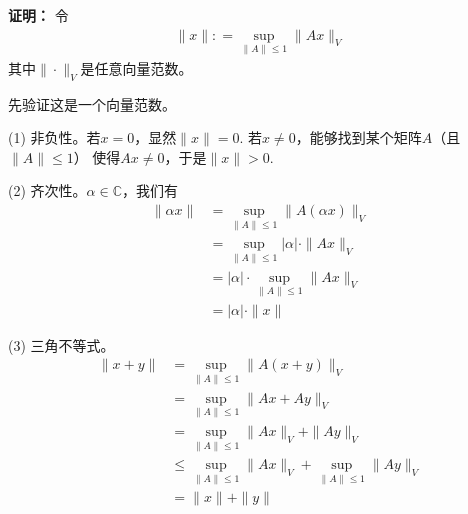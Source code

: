 \documentclass{article}
\begin{document}
\textbf{证明：}
令
\begin{align*}
  \|x\| : = \sup \limits_{\|A\| \leq 1} \|Ax\|_V
\end{align*}
其中$\|\cdot\|_V$是任意向量范数。

先验证这是一个向量范数。

(1) 非负性。若$x = 0$，显然$\|x\| = 0$. 若$x \neq 0$，能够找到某个矩阵$A$（且$\|A\| \leq 1$）
使得$Ax \neq 0$，于是$\|x\| > 0$.

(2) 齐次性。$\alpha \in \mathbb{C}$，我们有
\begin{align*}
  \|\alpha x\|
   & = \sup \limits_{\|A\| \leq 1} \|A(\alpha x)\|_V       \\
   & = \sup \limits_{\|A\| \leq 1} |\alpha| \cdot \|Ax\|_V \\
   & = |\alpha| \cdot \sup \limits_{\|A\| \leq 1} \|Ax\|_V \\
   & = |\alpha| \cdot \|x\|
\end{align*}

(3) 三角不等式。
\begin{align*}
  \|x + y\|
   & = \sup \limits_{\|A\| \leq 1} \|A(x + y)\|_V                                     \\
   & = \sup \limits_{\|A\| \leq 1} \|Ax + Ay\|_V                                      \\
   & = \sup \limits_{\|A\| \leq 1} \|Ax\|_V + \|Ay\|_V                                \\
   & \leq \sup \limits_{\|A\| \leq 1} \|Ax\|_V + \sup \limits_{\|A\| \leq 1} \|Ay\|_V \\
   & = \|x\| + \|y\|
\end{align*}
\end{document}
